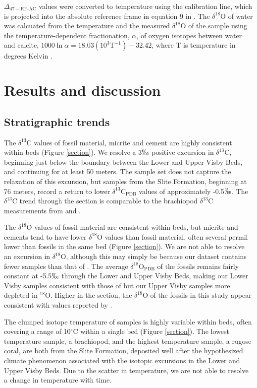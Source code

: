 \documentclass{article}
\newcommand{\deltao}{$\delta^{18}$}
\newcommand{\deltac}{$\delta^{13}$}
\newcommand{\degrees}{$^{\circ}$}
\begin{document}
$\Delta_{47-\text{RF-AC}}$ values were converted to temperature using the \cite{Ghosh2006} calibration line, which is projected into the absolute reference frame in equation 9 in \cite{Dennis2011}. The \deltao O of water was calcuated from the temperature and the measured \deltao O of the sample using the temperature-dependent fractionation, $\alpha$, of oxygen isotopes between water and calcite, $1000\ln\alpha=18.03\left(10^3\text{T}^{-1}\right)-32.42$, where T is temperature in degrees Kelvin \citep{Kim1997}. 

\section{Results and discussion}

\subsection{Stratigraphic trends}

The \deltac C values of fossil material, micrite and cement are highly consistent within beds (Figure \ref{section}). We resolve a 3$\permil$ positive excursion in \deltac C, beginning just below the boundary between the Lower and Upper Visby Beds, and continuing for at least 50 meters. The sample set does not capture the relaxation of this excursion, but samples from the Slite Formation, beginning at 76 meters, record a return to lower \deltac C$_{\text{PDB}}$ values of approximately -0.5$\permil$. The \deltac C trend through the section is comparable to the brachiopod \deltac C measurements from \cite{Bickert1997} and \cite{Munnecke2003}. 

The \deltao O values of fossil material are consistent within beds, but micrite and cements tend to have lower \deltao O values than fossil material, often several permil lower than fossils in the same bed (Figure \ref{section}). We are not able to resolve an excursion in \deltao O, although this may simply be because our dataset contains fewer samples than that of \cite{Munnecke2003}. The average \deltao O$_{\text{PDB}}$ of the fossils remains fairly constant at -5.5$\permil$ through the Lower and Upper Visby Beds, making our Lower Visby samples consistent with those of \cite{Munnecke2003} but our Upper Visby samples more depleted in $^{18}$O. Higher in the section, the \deltao O of the fossils in this study appear consistent with values reported by \cite{Bickert1997}. 

The clumped isotope temperature of samples is highly variable within beds, often covering a range of 10\degrees C within a single bed (Figure \ref{section}). The lowest temperature sample, a brachiopod, and the highest temperature sample, a rugose coral, are both from the Slite Formation, deposited well after the hypothesized climate phenomenon associated with the isotopic excursions in the Lower and Upper Visby Beds. Due to the scatter in temperature, we are not able to resolve a change in temperature with time. 
\end{document}
